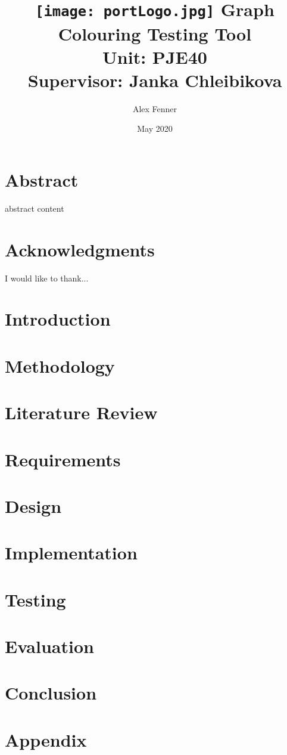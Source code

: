 \documentclass[12pt]{report}
\title{
    {\texttt{[image: portLogo.jpg]}}
    {Graph Colouring Testing Tool}\\
    {\large Unit: PJE40}\\
    {\large Supervisor: Janka Chleibikova}\\
}
\author{Alex Fenner}
\date{May 2020}
\begin{document}
\maketitle

\chapter*{Abstract}
abstract content

\chapter*{Acknowledgments}
I would like to thank...

\tableofcontents

\chapter{Introduction}


\chapter{Methodology}


\chapter{Literature Review}


\chapter{Requirements}


\chapter{Design}


\chapter{Implementation}


\chapter{Testing}


\chapter{Evaluation}


\chapter{Conclusion}


\chapter{Appendix}

\end{document}
